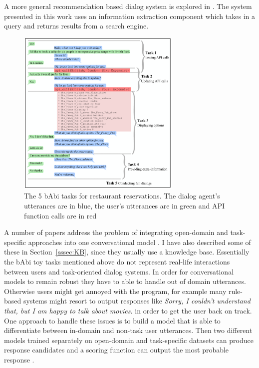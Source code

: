 \documentclass[12pt]{article}
\begin{document}
A more general recommendation based dialog system is explored in \cite{Yin:2017}. The system presented in this work uses an information extraction component which takes in a query and returns results from a search engine.

\begin{figure}[H]
	\centering
	\includegraphics[width=0.7\textwidth]{pics/babi.png}
	\caption{The 5 bAbi tasks for restaurant reservations. The dialog agent's utterances are in blue, the user's utterances are in green and API function calls are in red \cite{Bordes:2016}}
	\label{fig:babi}
\end{figure}
A number of papers address the problem of integrating open-domain and task-specific approaches into one conversational model \cite{Zhao:2017,Yu:2017,Akasaki:2017}. I have also described some of these in Section~\ref{sssec:KB}, since they usually use a knowledge base. Essentially the bAbi toy tasks mentioned above do not represent real-life interactions between users and task-oriented dialog systems. In order for conversational models to remain robust they have to able to handle out of domain utterances. Otherwise users might get annoyed with the program, for example many rule-based systems might resort to output responses like \textit{Sorry, I couldn't understand that, but I am happy to talk about movies.} in order to get the user back on track. One approach to handle these issues is to build a model that is able to differentiate between in-domain and non-task user utterances. Then two different models trained separately on open-domain and task-specific datasets can produce response candidates and a scoring function can output the most probable response \cite{Akasaki:2017}.
\end{document}
